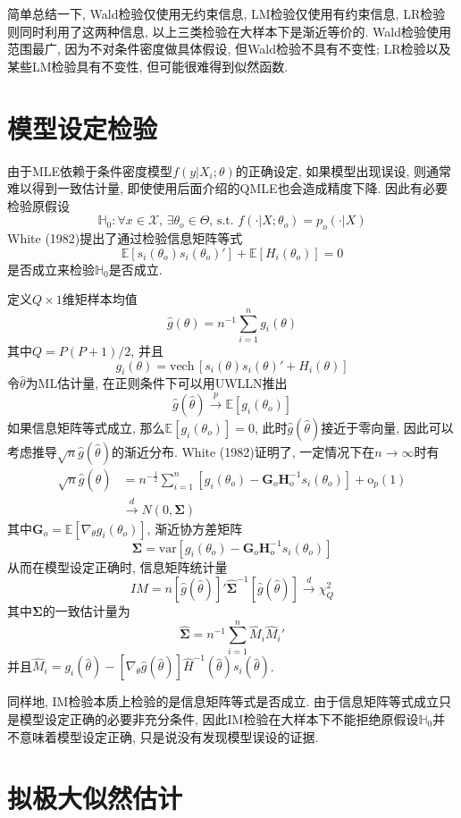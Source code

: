 \documentclass[cn, 12pt, math=mtpro2, bibstyle=apa, blue, twocol]{elegantbook}
\newcommand{\E}{\mathbb{E}}
\newcommand{\HH}{\mathbb{H}}
\newcommand{\BS}{\mathbold{\Sigma}}
\newcommand{\hth}{\hat{\theta}}
\begin{document}
简单总结一下, Wald检验仅使用无约束信息, LM检验仅使用有约束信息, LR检验则同时利用了这两种信息, 以上三类检验在大样本下是渐近等价的. Wald检验使用范围最广, 因为不对条件密度做具体假设, 但Wald检验不具有不变性; LR检验以及某些LM检验具有不变性, 但可能很难得到似然函数.
\section{模型设定检验}
由于MLE依赖于条件密度模型$f(y|X_i;\theta)$的正确设定, 如果模型出现误设, 则通常难以得到一致估计量, 即使使用后面介绍的QMLE也会造成精度下降. 因此有必要检验原假设$$\HH_0: \forall x\in\mathscr{X}, \, \exists\theta_o\in\Theta,\,\text{s.t. }f(\cdot|X;\theta_o)=p_o(\cdot|X)$$
White (1982)提出了通过检验信息矩阵等式
$$\E[s_i(\theta_o)s_i(\theta_o)']+\E[H_i(\theta_o)]=0$$
是否成立来检验$\HH_0$是否成立.

定义$Q\times 1$维矩样本均值
$$\hat{g}(\theta)=n^{-1}\sum_{i=1}^{n}g_i(\theta)$$
其中$Q=P(P+1)/2$, 并且
$$g_i(\theta)=\text{vech}\,[s_i(\theta)s_i(\theta)'+H_i(\theta)]$$
令$\hth$为ML估计量, 在正则条件下可以用UWLLN推出$$\hat{g}(\hth)\xrightarrow{p}\E[g_i(\theta_o)]$$如果信息矩阵等式成立, 那么$\E[g_i(\theta_o)]=0$, 此时$\hat{g}(\hth)$接近于零向量, 因此可以考虑推导$\sqrt{n}\hat{g}(\hth)$的渐近分布. White (1982)证明了, 一定情况下在$n\to\infty$时有
\begin{align*}
\sqrt{n}\hat{g}(\hth)&=n^{-\frac{1}{2}}\sum_{i=1}^{n}[g_i(\theta_o)-\mathbold{G}_o\mathbold{H}_o^{-1}s_i(\theta_o)]+\text{o}_p(1) \\
&\xrightarrow{d} N(0,\BS)
\end{align*}
其中$\mathbold{G}_o=\E[\nabla_\theta g_i(\theta_o)]$, 渐近协方差矩阵
$$\BS=\text{var}[g_i(\theta_o)-\mathbold{G}_o\mathbold{H}_o^{-1}s_i(\theta_o)]$$
从而在模型设定正确时, 信息矩阵统计量
$$IM=n[\hat{g}(\hth)]'\hat{\BS}^{-1}[\hat{g}(\hth)]\xrightarrow{d}\chi_Q^2$$
其中$\BS$的一致估计量为
$$\hat{\BS}=n^{-1}\sum_{i=1}^{n}\hat{M}_i\hat{M}_i'$$
并且$\hat{M}_i=g_i(\hth)-[\nabla_\theta \hat{g}(\hth)]\hat{H}^{-1}(\hth)s_i(\hth)$.

同样地, IM检验本质上检验的是信息矩阵等式是否成立. 由于信息矩阵等式成立只是模型设定正确的必要非充分条件, 因此IM检验在大样本下不能拒绝原假设$\HH_0$并不意味着模型设定正确, 只是说没有发现模型误设的证据.


\section{拟极大似然估计}
\end{document}
